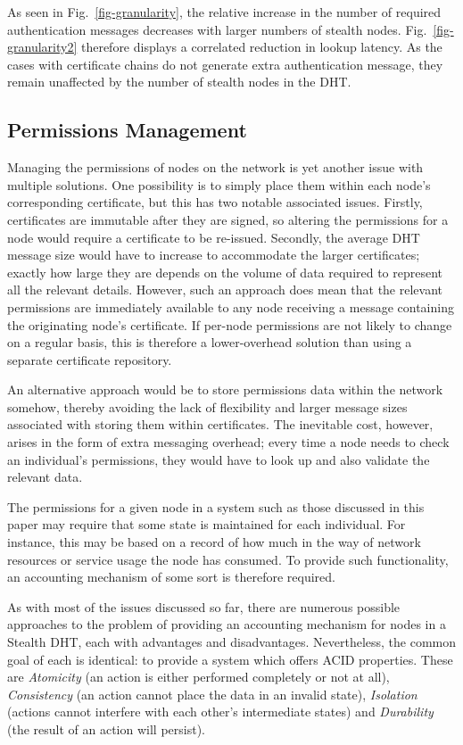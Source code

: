 \documentclass[pdftex,conference,10pt]{IEEEtran}
\begin{document}
As seen in Fig.~\ref{fig-granularity}, the relative increase in the
number of required authentication messages decreases with larger
numbers of stealth nodes. Fig.~\ref{fig-granularity2} therefore
displays a correlated reduction in lookup latency. As the cases with
certificate chains do not generate extra authentication message, they
remain unaffected by the number of stealth nodes in the DHT.

\subsection{Permissions Management}
\label{subsect-permissions}

Managing the permissions of nodes on the network is yet another issue
with multiple solutions. One possibility is to simply place them within
each node's corresponding certificate, but this has two notable
associated issues. Firstly, certificates are immutable after they are
signed, so altering the permissions for a node would require a
certificate to be re-issued. Secondly, the average DHT message size
would have to increase to accommodate the larger certificates; exactly
how large they are depends on the volume of data required to represent
all the relevant details. However, such an approach does mean that the
relevant permissions are immediately available to any node receiving a
message containing the originating node's certificate. If per-node
permissions are not likely to change on a regular basis, this is
therefore a lower-overhead solution than using a separate certificate
repository.

An alternative approach would be to store permissions data within the
network somehow, thereby avoiding the lack of flexibility and larger
message sizes associated with storing them within certificates. The
inevitable cost, however, arises in the form of extra messaging
overhead; every time a node needs to check an individual's permissions,
they would have to look up and also validate the relevant data.

The permissions for a given node in a system such as those discussed in
this paper may require that some state is maintained for each
individual. For instance, this may be based on a record of how much in
the way of network resources or service usage the node has consumed. To
provide such functionality, an accounting mechanism of some sort is
therefore required.

As with most of the issues discussed so far, there are numerous
possible approaches to the problem of providing an accounting mechanism
for nodes in a Stealth DHT, each with advantages and disadvantages.
Nevertheless, the common goal of each is identical: to provide a system
which offers ACID properties. These are \emph{Atomicity} (an action is
either performed completely or not at all), \emph{Consistency} (an
action cannot place the data in an invalid state), \emph{Isolation}
(actions cannot interfere with each other's intermediate states) and
\emph{Durability} (the result of an action will persist).
\end{document}
